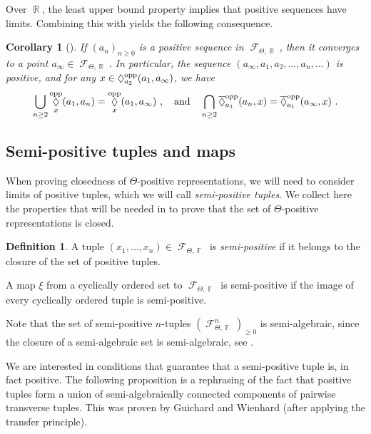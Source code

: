 \documentclass{amsart}
\theoremstyle{plain}
\newtheorem{corollary}[proposition]{Corollary}
\theoremstyle{definition}
\newtheorem{definition}[proposition]{Definition}
\DeclareMathOperator{\Diam}{\lozenge}
\DeclareMathOperator{\Fc}{\mathcal{F}}
\DeclareMathOperator{\Fb}{{\mathbb{F}}}
\DeclareMathOperator{\Rb}{{\mathbb{R}}}
\newcommand{\opp}{\textnormal{opp}}
\newcommand{\1}{\mathbf{1}}
\begin{document}
Over $\Rb$, the least upper bound property implies that positive sequences have limits. Combining this with  yields the following consequence.

\begin{corollary}[{\cite[Proposition 3.14]{GLW}}]
\label{proposition: least upper bounded property for positive sequence}
    If $(a_n)_{n\geq 0}$ is a positive sequence in $\Fc_{\Theta,\Rb}$, then it converges to a point $a_\infty \in \Fc_{\Theta,\Rb}$. In particular, the sequence $(a_\infty, a_1, a_2,\ldots , a_n, \ldots )$ is positive, and for any $x\in \Diam_{a_2}^\opp(a_1, a_\infty)$, we have \[\bigcup_{n\geq 2} \Diam_x^\opp(a_1,a_n) = \Diam_x^\opp(a_1,a_\infty)~,\quad\text{and} \quad \bigcap_{n\geq 2} \overline{\Diam}_{a_1}^\opp(a_n, x) = \overline{\Diam}_{a_1}^\opp(a_\infty, x)~.\]
\end{corollary}


\subsection{Semi-positive tuples and maps}

When proving closedness of $\Theta$-positive representations, we will need to consider limits of positive tuples, which we will call \emph{semi-positive tuples}.
We collect here the properties that will be needed in  to prove that the set of $\Theta$-positive representations is closed.

\begin{definition}
    A tuple $(x_1,\ldots, x_n) \in \Fc_{\Theta,\Fb}$ is \emph{semi-positive} if it belongs to the closure of the set of positive tuples.
    
    A map $\xi$ from a cyclically ordered set to $\Fc_{\Theta,\Fb}$ is semi-positive if the image of every cyclically ordered tuple is semi-positive.
\end{definition}

Note that the set of semi-positive $n$-tuples $(\Fc_{\Theta,\Fb}^n)_{\geq 0}$ is semi-algebraic, since the closure of a semi-algebraic set is semi-algebraic, see .


We are interested in conditions that guarantee that a semi-positive tuple is, in fact positive. The following proposition is a rephrasing of the fact that positive tuples form a union of semi-algebraically connected components of pairwise transverse tuples. This was proven by Guichard and Wienhard \cite{guichard2025generalizing} (after applying the transfer principle).
\end{document}
